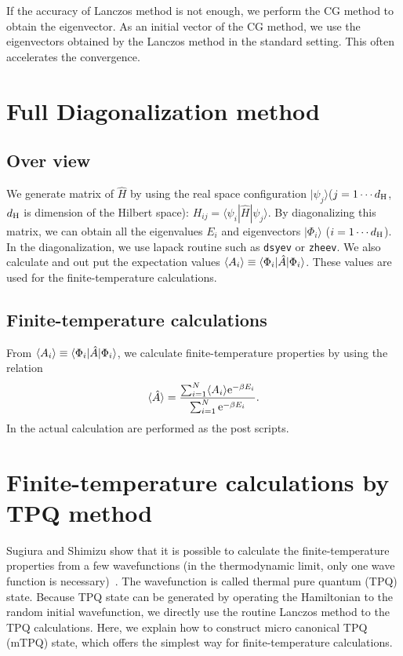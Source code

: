 If the accuracy of Lanczos method is not enough,
we perform the CG method to obtain the eigenvector.
As an initial vector of the CG method,
we use the eigenvectors obtained by the Lanczos method in the standard setting.
This often accelerates the convergence.
\section{Full Diagonalization method}
\label{Ch:AllDiagonalization}
\subsection{Over view}
We generate matrix of ${\hat{H}}$ by using the real space configuration 
$| \psi_j \rangle$($j=1\cdots d_{\rm H}$, $d_{\rm H}$ is dimension of the Hilbert space): 
$H_{ij}= \langle \psi_i | {\hat H} | \psi_j \rangle$.
By diagonalizing this matrix,
we can obtain all the eigenvalues $E_{i}$ and eigenvectors $|\Phi_i\rangle$ ($i=1 \cdots d_{\rm H}$). 
In the diagonalization, we use lapack routine such as \verb|dsyev| or \verb|zheev|.
We also calculate and out put
the expectation values $\langle A_i\rangle \equiv \langle \Phi_i | {\hat A} | \Phi_i\rangle$.
These values are used for the finite-temperature calculations.

\subsection{Finite-temperature calculations}
From
$\langle A_i\rangle \equiv \langle \Phi_i | {\hat A} | \Phi_i\rangle$,
we calculate finite-temperature properties by using the relation 
\begin{equation}
\langle {\hat A}\rangle=\frac{\sum_{i=1}^N \langle A_i\rangle {\rm  e}^{-\beta E_i}}{\sum_{i=1}^N{\rm  e}^{-\beta E_i}}.
\end{equation}
In the actual calculation are performed as the post scripts.

\section{Finite-temperature calculations by TPQ method}
\label{Ch:TPQ}
Sugiura and Shimizu show that
it is possible to calculate the finite-temperature properties
from a few wavefunctions (in the thermodynamic limit, only one wave function is necessary)~\cite{Sugiura2012}.
The wavefunction is called thermal pure quantum (TPQ) state.
Because TPQ state can be generated by operating the Hamiltonian 
to the random initial wavefunction,
we directly use the routine Lanczos method to the TPQ calculations.
Here, we explain how to construct micro canonical TPQ (mTPQ) state,
which offers the simplest way for finite-temperature calculations.

